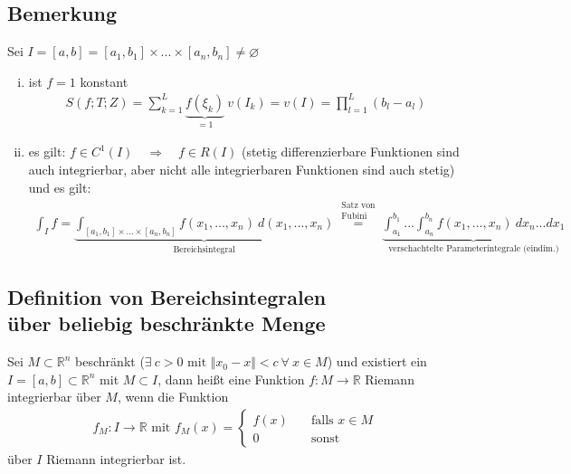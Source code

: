 \documentclass[11pt,a4paper]{book}
\newcommand {\R}	{\mathbb{R}}
\newcommand {\Rn}	{\mathbb{R}^n}
\newcommand{\1}    	{\mathbbm{1}}
\newcommand{\mitt}	{\textrm{ mit }}
\begin{document}
\subsection{Bemerkung}
Sei \(I = [a,b] = [a_1,b_1]\times...\times[a_n,b_n] \neq \varnothing\)
\begin{enumerate}[(i)]
	\item ist \(f = 1\) konstant
	\begin{align*}
		S(f;T;Z) = \sum_{k=1}^L \underbrace{f(\xi_k)}_{=1} ~ v(I_k)
		= v(I) = \prod_{l=1}^L (b_l - a_l)
	\end{align*}
	\item es gilt: \(f \in C^1(I) \quad\Rightarrow\quad f \in R(I)\) (stetig differenzierbare Funktionen sind auch integrierbar, aber nicht alle integrierbaren Funktionen sind auch stetig) und es gilt:
	\begin{align*}
		\int_I f = 
		\underbrace{
			\int_{[a_1,b_1]\times...\times[a_n,b_n]} f(x_1, ..., x_n)~d(x_1, ..., x_n) 
		}_{\textrm{Bereichsintegral}}
		\stackrel{\substack{\textrm{Satz von}\\\textrm{Fubini}}}{=} 
		\underbrace{
			\int_{a_1}^{b_1} ... \int_{a_n}^{b_n} f(x_1, ..., x_n) ~dx_n ... dx_1
		}_{\textrm{verschachtelte Parameterintegrale (eindim.)}}
	\end{align*}
\end{enumerate}

\subsection{Definition von Bereichsintegralen\\über beliebig beschränkte Menge}
Sei \(M \subset \Rn\) beschränkt (\(\exists~ c > 0 \mitt \Vert x_0 - x \Vert < c ~\forall~ x \in M\)) und existiert ein \(I = [a,b] \subset \Rn\) mit \(M \subset I\), dann heißt eine Funktion \(f:M\rightarrow\R\) Riemann integrierbar über \(M\), wenn die Funktion
\begin{align*}
	f_M : I \rightarrow \R \mitt f_M(x) = \left\{ \begin{array}{ll}
		f(x) &\quad \textrm{falls } x \in M \\
		0 &\quad \textrm{sonst}
	\end{array}\right.
\end{align*}
über \(I\) Riemann integrierbar ist.
\end{document}
